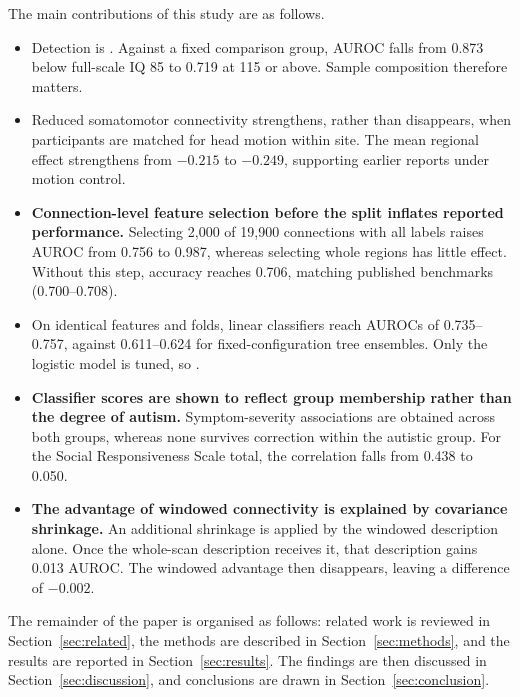 The main contributions of this study are as follows.
\begin{itemize}
\item \textbf{} Detection is
. Against a fixed comparison
group, AUROC falls from 0.873 below full-scale IQ 85 to 0.719 at 115 or above. Sample
composition therefore matters.
\item \textbf{}
Reduced somatomotor connectivity strengthens, rather than disappears, when participants are
matched for head motion within site. The mean regional effect strengthens from $-0.215$ to
$-0.249$, supporting earlier reports under motion control.
\item \textbf{Connection-level feature selection before the split inflates reported
performance.} Selecting 2,000 of 19,900 connections with all labels raises AUROC from 0.756
to 0.987, whereas selecting whole regions has little effect. Without this step, accuracy
reaches 0.706, matching published benchmarks (0.700--0.708).
\item \textbf{} On identical
features and folds, linear classifiers reach AUROCs of 0.735--0.757, against 0.611--0.624 for
fixed-configuration tree ensembles. Only the logistic model is tuned, so .
\item \textbf{Classifier scores are shown to reflect group membership rather than the degree
of autism.} Symptom-severity associations are obtained across both groups, whereas none
survives correction within the autistic group. For the Social Responsiveness Scale total, the
correlation falls from 0.438 to 0.050.
\item \textbf{The advantage of windowed connectivity is explained by covariance shrinkage.}
An additional shrinkage is applied by the windowed description alone. Once the whole-scan
description receives it, that description gains 0.013 AUROC. The windowed advantage then
disappears, leaving a difference of $-0.002$.
\end{itemize}
The remainder of the paper is organised as follows: related work is reviewed in
Section~\ref{sec:related}, the methods are described in
Section~\ref{sec:methods}, and the results are reported in Section~\ref{sec:results}.
The findings are then discussed in Section~\ref{sec:discussion}, and conclusions are drawn in
Section~\ref{sec:conclusion}.
